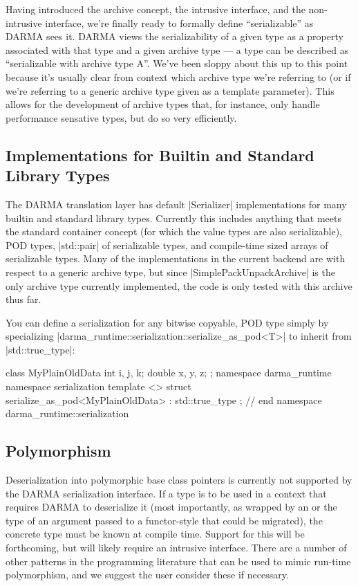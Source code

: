 Having introduced the \gls{archive} \gls{concept}, the intrusive interface, and the
non-intrusive interface, we're finally ready to formally define ``serializable''
as \gls{DARMA} sees it.  \gls{DARMA} views the serializability of a given type as a property
associated with that type and a given \gls{archive} type --- a type
 can be described
as ``serializable with \gls{archive} type A''.  We've been sloppy about this up to
this point because it's usually clear from context which \gls{archive} type we're
referring to (or if we're referring to a generic \gls{archive} type given as a
template parameter).  This allows for the development of \gls{archive} types that, for
instance, only handle performance sensative types, but do so very efficiently.

\subsection{Implementations for Builtin and Standard Library Types}

The \gls{DARMA} \gls{translation layer} has default |Serializer| implementations for many
builtin and standard library types.  Currently this includes anything that meets
the standard container \gls{concept} (for which the value types are also
serializable), \gls{POD} types, |std::pair| of serializable types, and
compile-time sized arrays of serializable types.  Many of the implementations in
the current backend are with respect to a generic \gls{archive} type, but since
|SimplePackUnpackArchive| is the only \gls{archive} type currently implemented,
the code is only tested with this \gls{archive} thus far.

You can define a serialization for any bitwise copyable, \gls{POD} type simply by
specializing |darma_runtime::serialization::serialize_as_pod<T>| to inherit from
|std::true_type|:
\begin{CppCodeNumb}
class MyPlainOldData {
  int i, j, k;
  double x, y, z; 
};
namespace darma_runtime { namespace serialization {
template <>
struct serialize_as_pod<MyPlainOldData> : std::true_type { };
}} // end namespace darma_runtime::serialization
\end{CppCodeNumb}

\subsection{Polymorphism}

Deserialization into polymorphic base class pointers is currently not supported
by the \gls{DARMA} serialization interface.  If a type is to be used in a context that
requires \gls{DARMA} to deserialize it (most importantly, as wrapped by an
 or the type of an argument passed to a
functor-style  that could be migrated), the concrete type must be
known at compile time.  Support for this will be forthcoming, but will likely require an intrusive interface.  
There are a number of other patterns in the programming
literature that can be used to mimic run-time polymorphism, and we suggest the
user consider these if necessary.


